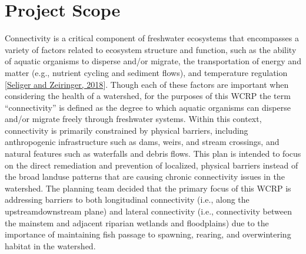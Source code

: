 \documentclass[letterpaper,10pt,english]{jupyterBook}
\let\sphinxpxdimen\pdfpxdimen\else\newdimen\sphinxpxdimen
\begin{document}
\chapter{Project Scope}
\label{\detokenize{Planning:project-scope}}
\sphinxAtStartPar
Connectivity is a critical component of freshwater ecosystems that encompasses a variety of factors related to ecosystem structure and function, such as the ability of aquatic organisms to disperse and/or migrate, the transportation of energy and matter (e.g., nutrient cycling and sediment flows), and temperature regulation {[}\hyperlink{cite.references:id24}{Seliger and Zeiringer, 2018}{]}. Though each of these factors are important when considering the health of a watershed, for the purposes of this WCRP the term “connectivity” is defined as the degree to which aquatic organisms can disperse and/or migrate freely through freshwater systems. Within this context, connectivity is primarily constrained by physical barriers, including anthropogenic infrastructure such as dams, weirs, and stream crossings, and natural features such as waterfalls and debris flows. This plan is intended to focus on the direct remediation and prevention of localized, physical barriers instead of the broad land\sphinxhyphen{}use patterns that are causing chronic connectivity issues in the watershed. The planning team decided that the primary focus of this WCRP is addressing barriers to both longitudinal connectivity (i.e., along the upstream\sphinxhyphen{}downstream plane) and lateral connectivity (i.e., connectivity between the mainstem and adjacent riparian wetlands and floodplains) due to the importance of maintaining fish passage to spawning, rearing, and overwintering habitat in the watershed.

\begin{figure}[htbp]
\centering
\capstart

\noindent\sphinxincludegraphics[width=1000\sphinxpxdimen,height=400\sphinxpxdimen]{{figure1}.png}
\caption{}\label{\detokenize{Planning:fig1}}\end{figure}
\end{document}
